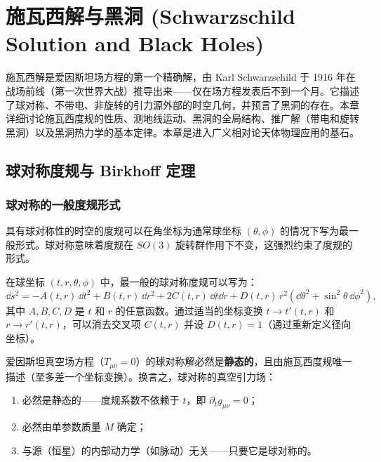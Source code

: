 \chapter{施瓦西解与黑洞 (Schwarzschild Solution and Black Holes)}
\label{chap:schwarzschild}

施瓦西解是爱因斯坦场方程的第一个精确解，由 Karl Schwarzschild 于 1916 年在战场前线（第一次世界大战）推导出来——仅在场方程发表后不到一个月。它描述了球对称、不带电、非旋转的引力源外部的时空几何，并预言了黑洞的存在。本章详细讨论施瓦西度规的性质、测地线运动、黑洞的全局结构、推广解（带电和旋转黑洞）以及黑洞热力学的基本定律。本章是进入广义相对论天体物理应用的基石。

\section{球对称度规与 Birkhoff 定理}
\label{sec:sph_sym}

\subsection{球对称的一般度规形式}

具有球对称性的时空的度规可以在角坐标为通常球坐标 $(\theta,\phi)$ 的情况下写为最一般形式。球对称意味着度规在 $SO(3)$ 旋转群作用下不变，这强烈约束了度规的形式。

\begin{definition}[球对称度规的一般形式]
在球坐标 $(t,r,\theta,\phi)$ 中，最一般的球对称度规可以写为：
\begin{equation}
    \dd s^2 = -A(t,r) \, \dd t^2 + B(t,r) \, \dd r^2 + 2 C(t,r) \, \dd t \dd r + D(t,r) \, r^2 (\dd\theta^2 + \sin^2\theta \, \dd\phi^2),
    \label{eq:gen_sph}
\end{equation}
其中 $A,B,C,D$ 是 $t$ 和 $r$ 的任意函数。通过适当的坐标变换 $t \to t'(t,r)$ 和 $r \to r'(t,r)$，可以消去交叉项 $C(t,r)$ 并设 $D(t,r)=1$（通过重新定义径向坐标）。
\end{definition}

\begin{theorem}[Birkhoff 定理]
\label{thm:birkhoff}
爱因斯坦真空场方程（$T_{\mu\nu}=0$）的球对称解必然是\textbf{静态的}，且由施瓦西度规唯一描述（至多差一个坐标变换）。换言之，球对称的真空引力场：\begin{enumerate}
    \item 必然是静态的——度规系数不依赖于 $t$，即 $\partial_t g_{\mu\nu}=0$；
    \item 必然由单参数质量 $M$ 确定；
    \item 与源（恒星）的内部动力学（如脉动）无关——只要它是球对称的。
\end{enumerate}
\end{theorem}

